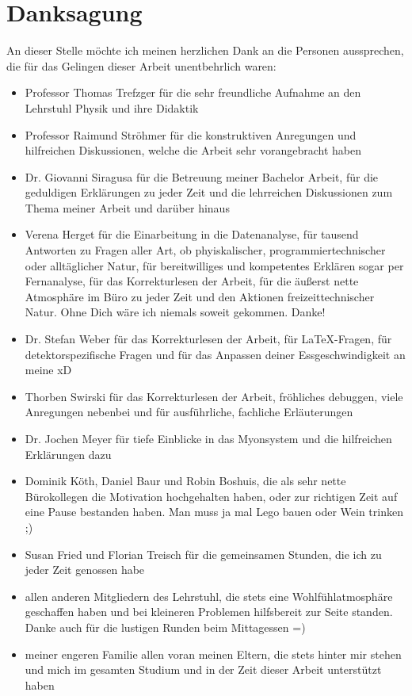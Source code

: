 \chapter*{Danksagung}
An dieser Stelle möchte ich meinen herzlichen Dank an die Personen aussprechen, die für das Gelingen dieser Arbeit unentbehrlich waren:
\begin{itemize}
 \item Professor Thomas Trefzger für die sehr freundliche Aufnahme an den Lehrstuhl Physik und ihre Didaktik
 \item Professor Raimund Ströhmer für die konstruktiven Anregungen und hilfreichen Diskussionen, welche die Arbeit sehr vorangebracht haben 
  \item Dr. Giovanni Siragusa für die Betreuung meiner Bachelor Arbeit, für die geduldigen Erklärungen zu jeder Zeit und die lehrreichen Diskussionen zum Thema meiner Arbeit und darüber hinaus
  \item Verena Herget für die Einarbeitung in die Datenanalyse, für tausend Antworten zu Fragen aller Art, ob phyiskalischer, programmiertechnischer oder alltäglicher Natur, für bereitwilliges und kompetentes Erklären sogar per Fernanalyse, für das Korrekturlesen der Arbeit, für die äußerst nette Atmosphäre im Büro zu jeder Zeit und den Aktionen freizeittechnischer Natur. Ohne Dich wäre ich niemals soweit gekommen. Danke! 
  \item Dr. Stefan Weber für das Korrekturlesen der Arbeit, für \LaTeX-Fragen, für detektorspezifische Fragen und für das Anpassen deiner Essgeschwindigkeit an meine xD 
  \item Thorben Swirski für das Korrekturlesen der Arbeit, fröhliches debuggen, viele Anregungen nebenbei und für ausführliche, fachliche Erläuterungen
  \item Dr. Jochen Meyer für tiefe Einblicke in das Myonsystem und die hilfreichen Erklärungen dazu 
  \item Dominik Köth, Daniel Baur und Robin Boshuis, die als sehr nette Bürokollegen die Motivation hochgehalten haben, oder zur richtigen Zeit auf eine Pause bestanden haben. Man muss ja mal Lego bauen oder Wein trinken ;)
  \item Susan Fried und Florian Treisch für die gemeinsamen Stunden, die ich zu jeder Zeit genossen habe 
  \item allen anderen Mitgliedern des Lehrstuhl, die stets eine Wohlfühlatmosphäre geschaffen haben und bei kleineren Problemen hilfsbereit zur Seite standen. Danke auch für die lustigen Runden beim Mittagessen =)
  \item meiner engeren Familie allen voran meinen Eltern, die stets hinter mir stehen und mich im gesamten Studium und in der Zeit dieser Arbeit unterstützt haben
\end{itemize}
